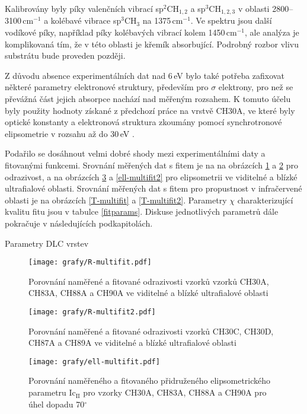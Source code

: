 Kalibrovány byly píky valenčních vibrací sp$^2$CH$_{1,2}$ a sp$^3$CH$_{1,2,3}$ v oblasti 2800--3100\,cm$^{-1}$ a kolébavé vibrace sp$^3$CH$_3$ na 1375\,cm$^{-1}$. Ve spektru jsou další vodíkové píky, například píky kolébavých vibrací kolem 1450\,cm$^{-1}$, ale analýza je komplikovaná tím, že v této oblasti je křemík absorbující. Podrobný rozbor vlivu substrátu bude proveden později.

Z důvodu absence experimentálních dat nad 6\,eV bylo také potřeba zafixovat některé parametry elektronové struktury, především pro $\sigma$ elektrony, pro než se převážná část jejich absorpce nachází nad měřeným rozsahem. K tomuto účelu byly použity hodnoty získané z předchozí práce na vrstvě CH30A, ve které byly optické konstanty a elektronová struktura zkoumány pomocí synchrotronové elipsometrie v rozsahu až do 30\,eV \cite{Franta2011}.

 Podařilo se dosáhnout velmi dobré shody mezi experimentálními daty a fitovanými funkcemi. Srovnání měřených dat s fitem je na na obrázcích \ref{R-multifit} a \ref{R-multifit2} pro odrazivost, a na obrázcích \ref{ell-multifit} a \ref{ell-multifit2} pro elipsometrii ve viditelné a blízké ultrafialové oblasti.  Srovnání měřených dat s fitem pro propustnost v infračervené oblasti je na obrázcích \ref{T-multifit} a \ref{T-multifit2}. Parametry $\chi$ charakterizující kvalitu fitu jsou v tabulce \ref{fitparams}. Diskuse jednotlivých parametrů dále pokračuje v následujících podkapitolách.

\begin{table}[tbhp]
 \centering
	\renewcommand{\tabcolsep}{4pt}
 
 \caption{Parametry DLC vrstev}
\label{fitparams}
\end{table}

\begin{figure}[htp]
	\texttt{[image: grafy/R-multifit.pdf]}
	\caption{Porovnání naměřené a fitované odrazivosti vzorků vzorků CH30A, CH83A, CH88A a CH90A ve viditelné a blízké ultrafialové oblasti}
	\label{R-multifit}
\end{figure}

\begin{figure}[htp]
	\texttt{[image: grafy/R-multifit2.pdf]}
	\caption{Porovnání naměřené a fitované odrazivosti vzorků CH30C, CH30D, CH87A a CH89A ve viditelné a blízké ultrafialové oblasti}
	\label{R-multifit2}
\end{figure}

\begin{figure}[htp]
	\texttt{[image: grafy/ell-multifit.pdf]}
	\caption{Porovnání naměřeného a fitovaného přidruženého elipsometrického parametru Ic$_{\mathrm{II}}$ pro vzorky CH30A, CH83A, CH88A a CH90A pro úhel dopadu 70$^\circ$}
	\label{ell-multifit}
\end{figure}


